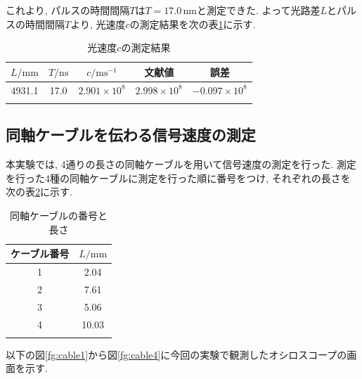 \documentclass{jarticle}
\begin{document}
これより, パルスの時間間隔$T$は$T=17.0\,\mathrm{nm}$と測定できた.
よって光路差$L$とパルスの時間間隔$T$より, 光速度$c$の測定結果を次の表\ref{tb:lightspeed-result}に示す.

\begin{table}[h]
  \centering
  \caption{光速度$c$の測定結果}
  \begin{tabular}{ccccc}
    \hline
    $L/\mathrm{mm}$ & $T/\mathrm{ns}$ & $c/\mathrm{ms^{-1}}$ & 文献値\cite{light-speed} & 誤差 \\
    \hline
    4931.1 & 17.0 & $2.901\times10^8$ & $2.998\times10^8$ & $-0.097\times10^8$ \\
    \hline
    \label{tb:lightspeed-result}
  \end{tabular}
\end{table}



\subsection{同軸ケーブルを伝わる信号速度の測定}

本実験では, 4通りの長さの同軸ケーブルを用いて信号速度の測定を行った.
測定を行った4種の同軸ケーブルに測定を行った順に番号をつけ, それぞれの長さを次の表\ref{tb:cable-length}に示す.

\begin{table}[h]
  \centering
  \caption{同軸ケーブルの番号と長さ}
  \begin{tabular}{cc}
    \hline
    ケーブル番号 & $L/\mathrm{mm}$ \\
    \hline
    1 & 2.04 \\
    2 & 7.61 \\
    3 & 5.06 \\
    4 & 10.03 \\
    \hline
    \label{tb:cable-length}
  \end{tabular}
\end{table}

以下の図\ref{fg:cable1}から図\ref{fg:cable4}に今回の実験で観測したオシロスコープの画面を示す.
\end{document}
